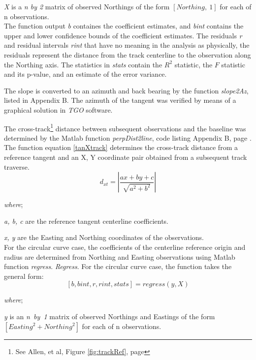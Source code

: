 \emph{X} is a \emph{n by 2} matrix of observed Northings of the form ${[Northing,~1]}$ for each of n observations.\\

The function output \emph{b} containes the coefficient estimates, and \emph{bint} contains the upper and lower confidence bounds of the coefficient estimates. The residuals \emph{r} and residual intervals \emph{rint} that have no meaning in the analysis as physically, the residuals represent the distance from the track centerline to the observation along the Northing axis. The statistics in \emph{stats} contain the ${R^2}$ statistic, the ${F}$ statistic and its p-value, and an estimate of the error variance.

The slope is converted to an azimuth and back bearing by the function \emph{slope2Az}, listed in Appendix B. The azimuth of the tangent was verified by means of a graphical solution in \emph{TGO} software.

The cross-track\footnote{See Allen, et al, Figure \ref{fig:trackRef}, page \pageref{fig:trackRef}} distance between subsequent observations and the baseline was determined by the Matlab function \emph{perpDist2line}, code listing Appendix B, page \pageref{software}. The function equation \ref{tanXtrack} determines the cross-track distance from a reference tangent and an X, Y coordinate pair obtained from a subsequent track traverse.
\begin{equation}
d_{xt} = \left|\frac{ax + by + c}{\sqrt{a^2 + b^2}}\right|
\label{tanXtrack}
\end{equation}

\emph{where};

\emph{a, b, c} are the reference tangent centerline coefficients.

\emph{x, y} are the Easting and Northing coordinates of the observations.\\

For the circular curve case, the coefficients of the centerline reference origin and radius are determined from Northing and Easting observations using Matlab function \emph{regress}. \emph{Regress}. For the circular curve case, the function takes the general form:
\begin{equation}
\label{crvReg}
[b,bint,r,rint,stats] = regress ( y, X )
\end{equation}

\emph{where};

\emph{y} is an \emph{n~by~1} matrix of observed Northings and Eastings of the form ${[Easting^2+Northing^2]}$ for each of n observations.

